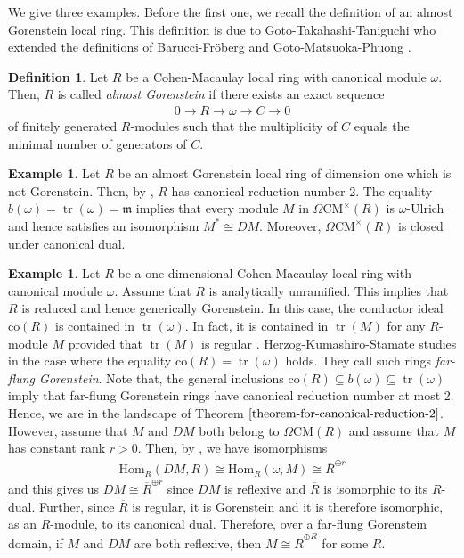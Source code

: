 \documentclass[12pt]{amsart}
\newcommand{\Hom}{\mathrm{Hom}}
\newcommand\co{\mathrm{co}}
\newcommand{\m}{\mathfrak{m}}
\newcommand{\CM}{\mathrm{CM}}
\theoremstyle{definition}
\newtheorem{definition}[theorem]{Definition}
\newtheorem{example}[theorem]{Example}
\numberwithin{equation}{theorem}
\DeclareMathOperator{\tr}{\mathrm{tr}}
\begin{document}
We give three examples. Before the first one, we recall the definition of an almost Gorenstein local ring. This definition is due to Goto-Takahashi-Taniguchi \cite{Goto-Takahashi-Taniguchi} who extended the definitions of Barucci-Fr{\"o}berg \cite{Barucci-Froberg} and Goto-Matsuoka-Phuong \cite{Goto-Matsuoka-Phuong}.
\begin{definition}\label{almost-Gorenstein-definition}
    Let $R$ be a Cohen-Macaulay local ring with canonical module $\omega$. Then, $R$ is called \textit{almost Gorenstein} if there exists an exact sequence 
    \begin{align*}
    0 \to R \to \omega \to C \to 0
    \end{align*}
    of finitely generated $R$-modules such that the multiplicity of $C$ equals the minimal number of generators of $C$.
\end{definition}
\begin{example}\label{almost-Gorenstein-example-which-shows-that-minimal-multiplicity-can-be-dropped}
    Let $R$ be an almost Gorenstein local ring of dimension one which is not Gorenstein. Then, by \cite[Therem 3.12]{Kumashiro}, $R$ has canonical reduction number 2. The equality $b(\omega) = \tr(\omega) = \m$ implies that every module $M$ in $\Omega \CM^\times(R)$ is $\omega$-Ulrich and hence satisfies an isomorphism $M^* \cong DM$. Moreover, $\Omega \CM^\times(R)$ is closed under canonical dual.
\end{example}
\begin{example}\label{far-flung-example}
    Let $R$ be a one dimensional Cohen-Macaulay local ring with canonical module $\omega$. Assume that $R$ is analytically unramified. This implies that $R$ is reduced and hence generically Gorenstein. In this case, the conductor ideal $\co(R)$ is contained in $\tr(\omega)$. In fact, it is contained in $\tr(M)$ for any $R$-module $M$ provided that $\tr(M)$ is regular \cite[Corollary 3.6]{Dao-Maitra-Sridhar}. Herzog-Kumashiro-Stamate studies in \cite{Herzog-Kumashiro-Stamate} the case where the equality $\co(R)= \tr(\omega)$  holds. They call such rings \textit{far-flung Gorenstein}. Note that, the general inclusions $\co(R) \subseteq b(\omega) \subseteq \tr(\omega)$ imply that far-flung Gorenstein rings have canonical reduction number at most 2. Hence, we are in the landscape of Theorem $\ref{theorem-for-canonical-reduction-2}$. However, assume that $M$ and $DM$ both belong to $\Omega \CM(R)$ and assume that $M$ has constant rank $r >0$. Then, by \cite[Theorem 4.1]{Herzog-Kumashiro-Stamate}, we have isomorphisms
    \begin{align*}
       \Hom_R(DM, R) \cong \Hom_R(\omega, M) \cong \overline{R}^{\oplus r}
    \end{align*}
    and this gives us $DM \cong \overline{R}^{\oplus r}$ since $DM$ is reflexive and $\overline{R}$ is isomorphic to its $R$-dual. Further, since $\overline{R}$ is regular, it is Gorenstein and it is therefore isomorphic, as an $R$-module, to its canonical dual. Therefore, over a far-flung Gorenstein domain, if $M$ and $DM$ are both reflexive, then $M \cong \overline{R}^{\oplus R}$ for some $R$. 
\end{example}
\end{document}
